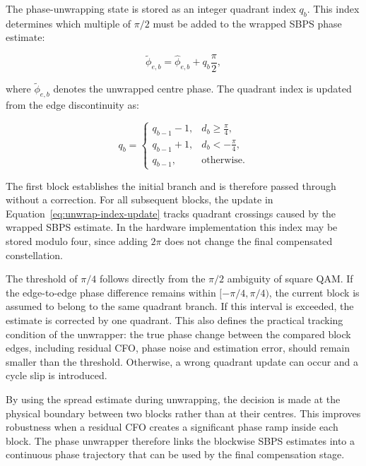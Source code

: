 The phase-unwrapping state is stored as an integer quadrant index $q_b$. This index determines which multiple of $\pi/2$ must be added to the wrapped \ac{SBPS} phase estimate:

\begin{equation}
\tilde{\phi}_{e,b}
=
\hat{\phi}_{e,b}
+
q_b\frac{\pi}{2},
\label{eq:unwrapped-centre-phase}
\end{equation}

where $\tilde{\phi}_{e,b}$ denotes the unwrapped centre phase. The quadrant index is updated from the edge discontinuity as:

\begin{equation}
q_b =
\begin{cases}
q_{b-1}-1, & d_b \geq \frac{\pi}{4},\\
q_{b-1}+1, & d_b < -\frac{\pi}{4},\\
q_{b-1}, & \text{otherwise}.
\end{cases}
\label{eq:unwrap-index-update}
\end{equation}

The first block establishes the initial branch and is therefore passed through without a correction. For all subsequent blocks, the update in Equation~\ref{eq:unwrap-index-update} tracks quadrant crossings caused by the wrapped \ac{SBPS} estimate. In the hardware implementation this index may be stored modulo four, since adding $2\pi$ does not change the final compensated constellation.

The threshold of $\pi/4$ follows directly from the $\pi/2$ ambiguity of square \ac{QAM}. If the edge-to-edge phase difference remains within $[-\pi/4,\pi/4)$, the current block is assumed to belong to the same quadrant branch. If this interval is exceeded, the estimate is corrected by one quadrant. This also defines the practical tracking condition of the unwrapper: the true phase change between the compared block edges, including residual \ac{CFO}, phase noise and estimation error, should remain smaller than the threshold. Otherwise, a wrong quadrant update can occur and a cycle slip is introduced.

By using the spread estimate during unwrapping, the decision is made at the physical boundary between two blocks rather than at their centres. This improves robustness when a residual \ac{CFO} creates a significant phase ramp inside each block. The phase unwrapper therefore links the blockwise \ac{SBPS} estimates into a continuous phase trajectory that can be used by the final compensation stage.

